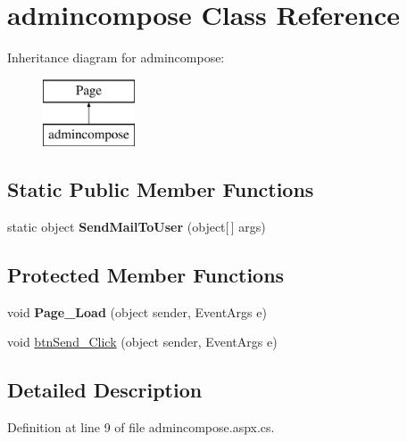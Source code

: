 \hypertarget{classadmincompose}{\section{admincompose Class Reference}
\label{classadmincompose}
}
Inheritance diagram for admincompose\-:\begin{figure}[H]
\begin{center}
\leavevmode
\includegraphics[height=2.000000cm]{classadmincompose}
\end{center}
\end{figure}
\subsection*{Static Public Member Functions}
\begin{DoxyCompactItemize}
\item 
\hypertarget{classadmincompose_a048a86e0c84363d80553d245266ebddc}{static object {\bfseries Send\-Mail\-To\-User} (object\mbox{[}$\,$\mbox{]} args)}\label{classadmincompose_a048a86e0c84363d80553d245266ebddc}

\end{DoxyCompactItemize}
\subsection*{Protected Member Functions}
\begin{DoxyCompactItemize}
\item 
\hypertarget{classadmincompose_a0b12819d930fd60d00069752e89333e1}{void {\bfseries Page\-\_\-\-Load} (object sender, Event\-Args e)}\label{classadmincompose_a0b12819d930fd60d00069752e89333e1}

\item 
void \hyperlink{classadmincompose_a887593d120b4d4c7f71fbd1c24ad6b03}{btn\-Send\-\_\-\-Click} (object sender, Event\-Args e)
\end{DoxyCompactItemize}


\subsection{Detailed Description}


Definition at line 9 of file admincompose.\-aspx.\-cs.




